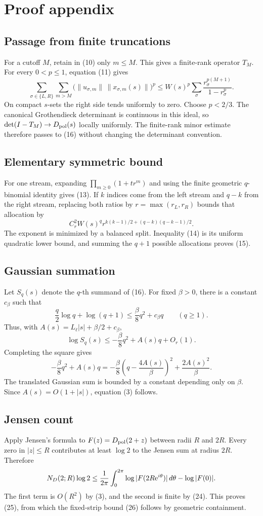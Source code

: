 \section{Proof appendix}

\subsection{Passage from finite truncations}
For a cutoff \(M\), retain in (10) only \(m\le M\). This gives a finite-rank
operator \(T_M\). For every \(0<p\le1\), equation (11) gives
\[
 \sum_{\sigma\in\{L,R\}}\sum_{m>M}
 \bigl(\|u_{\sigma,m}\|\,\|x_{\sigma,m}(s)\|\bigr)^p
 \le W(s)^p\sum_\sigma\frac{r_\sigma^{p(M+1)}}{1-r_\sigma^p}.
\]
On compact \(s\)-sets the right side tends uniformly to zero. Choose
\(p<2/3\). The canonical Grothendieck determinant is continuous in this
ideal, so \(\det(I-T_M)\to D_{\mathrm{pol}}(s)\) locally uniformly. The finite-rank
minor estimate therefore passes to (16) without changing the determinant
convention.

\subsection{Elementary symmetric bound}
For one stream, expanding
\(\prod_{m\ge0}(1+tr^m)\) and using the finite geometric
\(q\)-binomial identity gives (13). If \(k\) indices come from the left
stream and \(q-k\) from the right stream, replacing both ratios by
\(r=\max(r_L,r_R)\) bounds that allocation by
\[
 C_r^2W(s)^q
 r^{k(k-1)/2+(q-k)(q-k-1)/2}.
\]
The exponent is minimized by a balanced split. Inequality (14) is its
uniform quadratic lower bound, and summing the \(q+1\) possible allocations
proves (15).

\subsection{Gaussian summation}
Let \(S_q(s)\) denote the \(q\)-th summand of (16). For fixed
\(\beta>0\), there is a constant \(c_\beta\) such that
\[
 \frac q2\log q+\log(q+1)
 \le\frac\beta8q^2+c_\beta q
 \qquad(q\ge1).
\]
Thus, with \(A(s)=L_\ell|s|+\beta/2+c_\beta\),
\[
 \log S_q(s)\le
 -\frac\beta8q^2+A(s)q+O_r(1).
\]
Completing the square gives
\[
 -\frac\beta8q^2+A(s)q
 =-\frac\beta8\left(q-\frac{4A(s)}\beta\right)^2
 +\frac{2A(s)^2}{\beta}.
\]
The translated Gaussian sum is bounded by a constant depending only on
\(\beta\). Since \(A(s)=O(1+|s|)\), equation (3) follows.

\subsection{Jensen count}
Apply Jensen's formula to \(F(z)=D_{\mathrm{pol}}(2+z)\) between radii \(R\) and
\(2R\). Every zero in \(|z|\le R\) contributes at least \(\log2\) to the
Jensen sum at radius \(2R\). Therefore
\[
 N_D(2;R)\log2
 \le \frac1{2\pi}\int_0^{2\pi}
 \log|F(2R\mathrm{e}^{i\theta})|\,d\theta-\log|F(0)|.
\]
The first term is \(O(R^2)\) by (3), and the second is finite by (24).
This proves (25), from which the fixed-strip bound (26) follows by geometric
containment.
